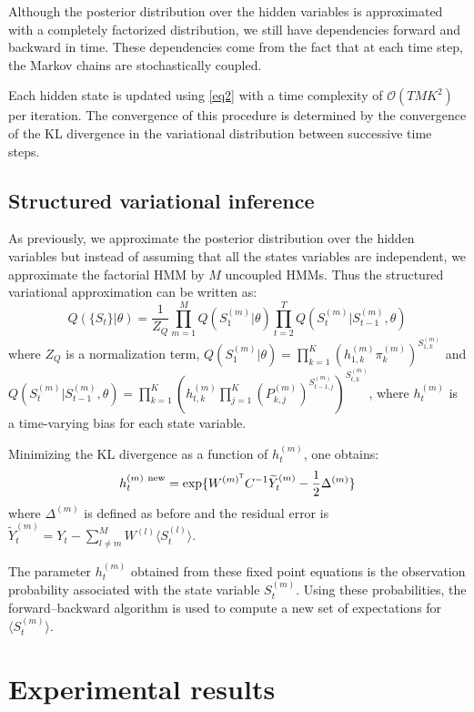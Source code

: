 \documentclass{article}
\begin{document}
Although the posterior distribution over the hidden variables is approximated with a completely factorized distribution, we still have dependencies forward and backward in time. These dependencies come from the fact that at each time step, the Markov chains are stochastically coupled.

Each hidden state is updated using \ref{eq2} with a time complexity of $\mathcal{O}(T M K^2)$ per iteration. The convergence of this procedure is determined by the convergence of the KL divergence in the variational distribution between successive time steps.

\subsection{Structured variational inference}

As previously, we approximate the posterior distribution over the hidden variables but instead of assuming that all the states variables are independent, we approximate the factorial HMM by $M$ uncoupled HMMs. Thus the structured variational approximation can be written as:
\[ Q(\{ S_t \}| \theta) = \frac{1}{Z_Q} \prod_{m=1}^M Q( S_1^{(m)} | \theta) \prod_{t=2}^T Q(S_t^{(m)} | S_{t-1}^{(m)}, \theta) \]
where $Z_Q$ is a normalization term, $Q( S_1^{(m)} | \theta)= \prod_{k=1}^K \left( h_{1,k}^{(m)} \pi_k^{(m)} \right)^{S_{1,k}^{(m)}}$ and $Q(S_t^{(m)} | S_{t-1}^{(m)}, \theta)= \prod_{k=1}^K \left( h_{t,k}^{(m)} \prod_{j=1}^K (P_{k,j}^{(m)})^{S_{t-1,j}^{(m)}} \right)^{S_{t,k}^{(m)}}$, where $h_t^{(m)}$ is a time-varying bias for each state variable.

Minimizing the KL divergence as a function of $h_t^{(m)}$, one obtains:
\begin{equation}
h_t^{(m) \ \textnormal{new}} = \exp\{ W^{(m)^\mathsf{T}} C^{-1} \widetilde{Y}_t^{(m)} - \frac{1}{2} \Delta^{(m)} \}
\label{eq3}
\end{equation}
where $\Delta^{(m)}$ is defined as before and the residual error is $\widetilde{Y}_t^{(m)} = Y_t - \sum_{l \ne m}^M W^{(l)} \langle S_t^{(l)} \rangle$.

The parameter $h_t^{(m)}$ obtained from these fixed point equations is the observation probability associated with the state variable $S_t^{(m)}$. Using these probabilities, the forward–backward algorithm is used to compute a new set of expectations for $\langle S_t^{(m)} \rangle$.

\section{Experimental results}
\end{document}
